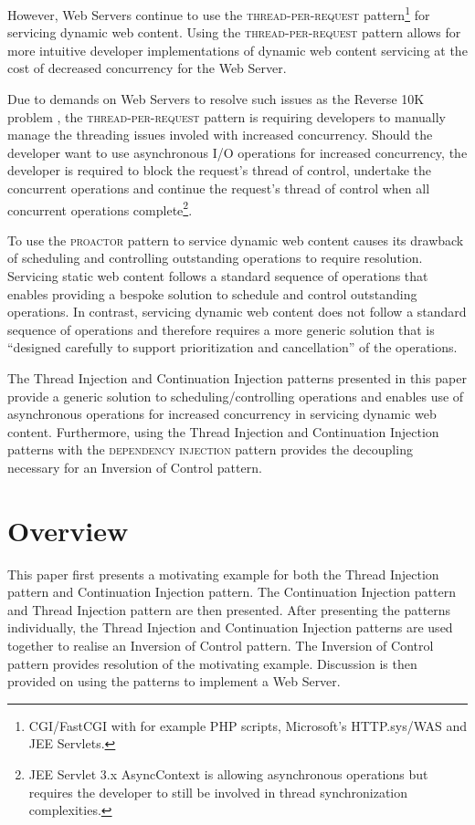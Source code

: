 \documentclass[prodmode]{style/acmlarge}
\begin{document}
However, Web Servers continue to use the \textsc{thread-per-request}
pattern\footnote{CGI/FastCGI with for example PHP scripts, Microsoft's
HTTP.sys/WAS and JEE Servlets.} for servicing dynamic web content.  Using the
\textsc{thread-per-request} pattern allows for more intuitive developer
implementations of dynamic web content servicing at the cost of decreased
concurrency for the Web Server.

Due to demands on Web Servers to resolve such issues as the Reverse 10K problem
\cite{reverse-ten-k-problem}, the \textsc{thread-per-request} pattern is
requiring developers to manually manage the threading issues involed with
increased concurrency.  Should the developer want to use asynchronous I/O
operations for increased concurrency, the developer is required to block the
request's thread of control, undertake the concurrent operations and continue
the request's thread of control when all concurrent operations
complete\footnote{JEE Servlet 3.x AsyncContext is allowing asynchronous
operations but requires the developer to still be involved in thread
synchronization complexities.}.

To use the \textsc{proactor} pattern to service dynamic web content causes its
drawback of scheduling and controlling outstanding operations \cite[p.
8]{proactor} to require resolution.  Servicing static web content follows a
standard sequence of operations that enables providing a bespoke solution to
schedule and control outstanding operations.  In contrast, servicing dynamic web
content does not follow a standard sequence of operations and therefore requires
a more generic solution that is ``designed carefully to support prioritization
and cancellation'' \cite[p. 8]{proactor} of the operations.

The Thread Injection and Continuation Injection patterns presented in this paper
provide a generic solution to scheduling/controlling operations and enables use
of asynchronous operations for increased concurrency in servicing dynamic web
content.  Furthermore, using the Thread Injection and Continuation Injection
patterns with the \textsc{dependency injection} pattern \cite{ioc} provides the
decoupling necessary for an Inversion of Control pattern.


\section{Overview}

This paper first presents a motivating example for both the Thread Injection
pattern and Continuation Injection pattern.  The Continuation Injection pattern
and Thread Injection pattern are then presented.  After presenting the patterns
individually, the Thread Injection and Continuation Injection patterns are used
together to realise an Inversion of Control pattern.  The Inversion of Control
pattern provides resolution of the motivating example.  Discussion is then
provided on using the patterns to implement a Web Server.
\end{document}
